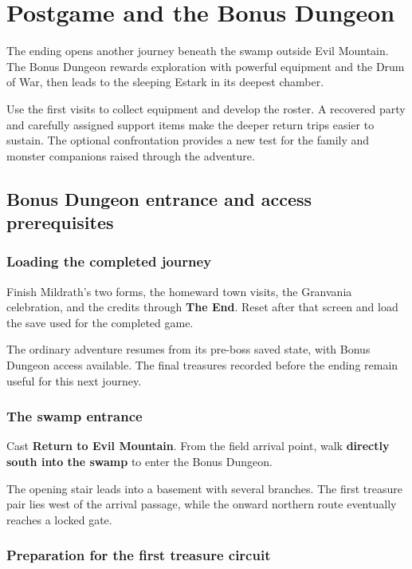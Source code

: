 \chapter{Postgame and the Bonus Dungeon}
\label{written-postgame}

The ending opens another journey beneath the swamp outside
Evil Mountain. The Bonus Dungeon rewards exploration with
powerful equipment and the Drum of War, then leads to the
sleeping Estark in its deepest chamber.

Use the first visits to collect equipment and develop the
roster. A recovered party and carefully assigned support
items make the deeper return trips easier to sustain.
The optional confrontation provides a new test for the
family and monster companions raised through the adventure.

\section{Bonus Dungeon entrance and access prerequisites}

\subsection*{Loading the completed journey}

Finish Mildrath's two forms, the homeward town visits,
the Granvania celebration, and the credits through
\textbf{The End}. Reset after that screen and load
the save used for the completed game.

The ordinary adventure resumes from its pre-boss saved
state, with Bonus Dungeon access available. The final
treasures recorded before the ending remain useful
for this next journey.

\subsection*{The swamp entrance}

Cast \textbf{Return to Evil Mountain}. From the field
arrival point, walk \textbf{directly south into the swamp}
to enter the Bonus Dungeon.

The opening stair leads into a basement with several
branches. The first treasure pair lies west of the
arrival passage, while the onward northern route
eventually reaches a locked gate.

\subsection*{Preparation for the first treasure circuit}

